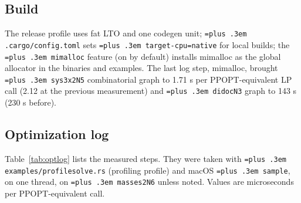 \documentclass[10pt,a4paper]{article}
\newcommand{\ppopt}{PPOPT}
\newcommand{\code}[1]{{\let\_\bu\texttt{\spaceskip=\fontdimen2\font plus .3em #1}}}
\newcommand{\bu}{\textunderscore\hspace{0pt}}
\begin{document}
\subsection{Build}

The release profile uses fat LTO and one codegen unit; \code{.cargo/config.toml} sets \code{target-cpu=native} for local builds; the
\code{mimalloc} feature (on by default) installs mimalloc as the global allocator in the binaries and examples. The last log step, mimalloc, brought
\code{sys3x2\_N5} combinatorial graph to 1.71 \textmu s per \ppopt{}-equivalent LP call (2.12 at the previous measurement) and \code{di\_doc\_N3} graph to 143 \textmu s (230 \textmu s before).

\subsection{Optimization log}

Table~\ref{tab:optlog} lists the measured steps. They were taken with \code{examples/profile\_solve.rs} (profiling profile) and macOS
\code{sample}, on one thread, on \code{masses2\_N6} unless noted. Values are microseconds per \ppopt{}-equivalent call.
\end{document}
